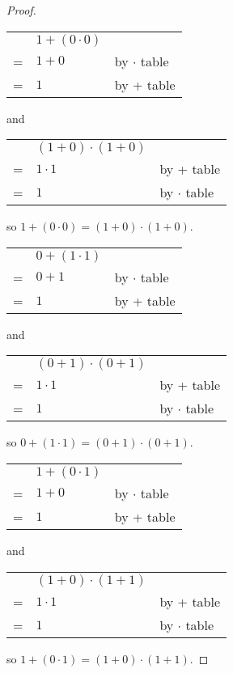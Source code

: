 \documentclass[14pt]{extarticle}
\newcommand{\cy}{\color{cyan}}
\begin{document}
\begin{proof}
  \begin{tabular}{cll}
      & \(1 + (0 \cdot 0)\) &                        \\
    = & \(1 + 0\)           & {\cy by $\cdot$ table} \\
    = & \(1\)               & {\cy by + table}
  \end{tabular}
  and
  \begin{tabular}{cll}
      & \((1 + 0) \cdot (1 + 0)\) &                        \\
    = & \(1 \cdot 1\)             & {\cy by + table}       \\
    = & \(1\)                     & {\cy by $\cdot$ table}
  \end{tabular}

  so \(1 + (0 \cdot 0) = (1 + 0) \cdot (1 + 0)\).

  \begin{tabular}{cll}
      & \(0 + (1 \cdot 1)\) &                        \\
    = & \(0 + 1\)           & {\cy by $\cdot$ table} \\
    = & \(1\)               & {\cy by + table}
  \end{tabular}
  and
  \begin{tabular}{cll}
      & \((0 + 1) \cdot (0 + 1)\) &                        \\
    = & \(1 \cdot 1\)             & {\cy by + table}       \\
    = & \(1\)                     & {\cy by $\cdot$ table}
  \end{tabular}

  so \(0 + (1 \cdot 1) = (0 + 1) \cdot (0 + 1)\).

  \begin{tabular}{cll}
      & \(1 + (0 \cdot 1)\) &                        \\
    = & \(1 + 0\)           & {\cy by $\cdot$ table} \\
    = & \(1\)               & {\cy by + table}
  \end{tabular}
  and
  \begin{tabular}{cll}
      & \((1 + 0) \cdot (1 + 1)\) &                        \\
    = & \(1 \cdot 1\)             & {\cy by + table}       \\
    = & \(1\)                     & {\cy by $\cdot$ table}
  \end{tabular}

  so \(1 + (0 \cdot 1) = (1 + 0) \cdot (1 + 1)\).


\end{proof}
\end{document}
